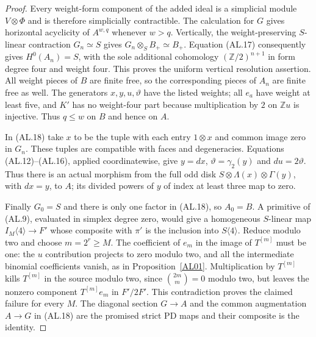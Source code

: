 \begin{proof}
Every weight-form component of the added ideal is a
simplicial module $V\otimes\Phi$ and is therefore
simplicially contractible.  The calculation for $G$ gives
horizontal acyclicity of $A^{w,q}$ whenever $w>q$.
Vertically, the weight-preserving $S$-linear contraction
$G_n\simeq S$ gives
$G_n\otimes_SB_+\simeq B_+$.
Equation \textup{(AL.17)} consequently gives
$H^0(A_n)=S$, with the sole additional cohomology
$(\mathbb Z/2)^{n+1}$ in form degree four and weight four.
This proves the uniform vertical resolution assertion.
All weight pieces of $B$ are finite free, so the corresponding
pieces of $A_n$ are finite free as well.  The generators
$x,y,u,\vartheta$ have the listed weights; all $e_a$ have
weight at least five, and $K'$ has no weight-four part
because multiplication by $2$ on $\mathbb Z u$ is injective.
Thus $q\leq w$ on $B$ and hence on $A$.

In \textup{(AL.18)} take $x$ to be the tuple with each entry
$1\otimes x$ and common image zero in $G_n$.
These tuples are compatible with faces and degeneracies.
Equations \textup{(AL.12)--(AL.16)}, applied coordinatewise,
give $y=dx$, $\vartheta=\gamma_2(y)$ and $du=2\vartheta$.
Thus there is an actual morphism from the full odd disk
$S\otimes\Lambda(x)\otimes\Gamma(y)$, with $dx=y$, to $A$;
its divided powers of $y$ of index at least three map to zero.

Finally $G_0=S$ and there is only one factor in
\textup{(AL.18)}, so $A_0=B$.
A primitive of \textup{(AL.9)}, evaluated in simplex degree
zero, would give a homogeneous $S$-linear map
$I_M\langle4\rangle\to F'$ whose composite with $\pi'$
is the inclusion into $S\langle4\rangle$.
Reduce modulo two and choose $m=2^r\geq M$.
The coefficient of $e_m$ in the image of $T^{[m]}$ must
be one: the $u$ contribution projects to zero modulo two,
and all the intermediate binomial coefficients vanish,
as in Proposition~\ref{AL01}.
Multiplication by $T^{[m]}$ kills $T^{[m]}$ in the source
modulo two, since $\binom{2m}{m}=0$ modulo two, but leaves
the nonzero component $T^{[m]}e_m$ in $F'/2F'$.
This contradiction proves the claimed failure for every $M$.
The diagonal section $G\to A$ and the common augmentation
$A\to G$ in \textup{(AL.18)} are the promised strict PD maps
and their composite is the identity.
\end{proof}

